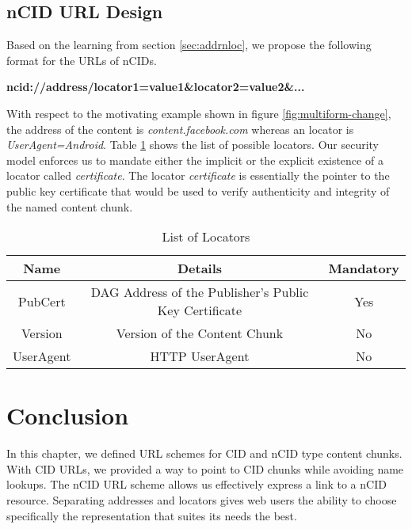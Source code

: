 \subsection{nCID URL Design}
Based on the learning from section \ref{sec:addrnloc}, we propose the
following format for the URLs of nCIDs.
\begin{center}
  \textbf{ncid://address/locator1=value1\&locator2=value2\&...}
\end{center}
With respect to the motivating example shown in figure
\ref{fig:multiform-change}, the address of the content is
\emph{content.facebook.com} whereas an locator is
\emph{UserAgent=Android}. Table \ref{tab:locators} shows the list of
possible locators. Our security model enforces us to mandate either
the implicit or the explicit existence of a locator called
\emph{certificate}. The locator \emph{certificate} is essentially the
pointer to the public key certificate that would be used to verify
authenticity and integrity of the named content chunk.

\begin{table}
  \begin{center}
    \begin{tabular}
      {c | c | c}
      Name & Details & Mandatory \\
      \hline
      PubCert & DAG Address of the Publisher's Public Key Certificate & Yes \\
      Version & Version of the Content Chunk & No\\
      UserAgent & HTTP UserAgent & No\\
    \end{tabular}
    \label{tab:locators}
  \end{center}
  \caption{List of Locators}
\end{table}

\section{Conclusion}

In this chapter, we defined URL schemes for CID and nCID type content
chunks. With CID URLs, we provided a way to point to CID chunks while
avoiding name lookups. The nCID URL scheme allows us effectively
express a link to a nCID resource. Separating addresses and locators
gives web users the ability to choose specifically the representation
that suites its needs the best.

